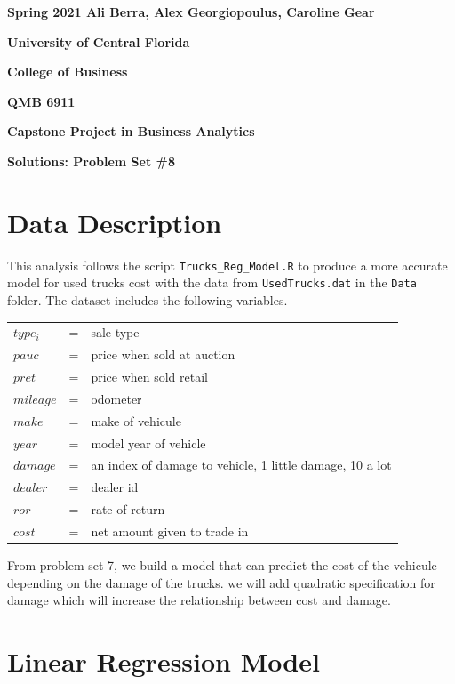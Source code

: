\documentclass[11pt]{paper}
\begin{document}

\pagestyle{empty}
{\noindent\bf Spring 2021 \hfill Ali Berra, Alex Georgiopoulus, Caroline Gear}
\vskip 16pt
\centerline{\bf University of Central Florida}
\centerline{\bf College of Business}
\vskip 16pt
\centerline{\bf QMB 6911}
\centerline{\bf Capstone Project in Business Analytics}
\vskip 10pt
\centerline{\bf Solutions:  Problem Set \#8}
\vskip 32pt
\noindent
% 
\section{Data Description}

This analysis follows the script \texttt{Trucks\_Reg\_Model.R} to produce a more accurate model for used trucks cost with the data from \texttt{UsedTrucks.dat} in the \texttt{Data} folder. 
The dataset includes the following variables.
\begin{table}[h!]
\begin{tabular}{l l l}

$type_i$ & = & sale type \\

$pauc$ & = & price when sold at auction \\
$ pret$ & = &price when sold retail \\ 
$mileage$ & = & odometer \\ %
$make$ & = &make of vehicule \\
$year$ & = &model year of vehicle \\ 
$damage$ & = & an index of damage to vehicle, 1 little damage, 10 a lot\\
$dealer$ & = & dealer id \\ 
$ror$& = &rate-of-return\\
$cost$& = &net amount given to trade in\\


\end{tabular}
\end{table}
%
From problem set 7, we build a model that can predict the cost of the vehicule depending 
on the damage of the trucks. we will add quadratic specification for damage 
which will increase the relationship between cost and damage. 



\clearpage
\section{Linear Regression Model}
\end{document}
